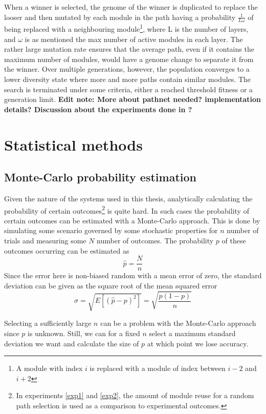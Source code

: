 When a winner is selected, the genome of the winner is duplicated to replace the looser and then mutated by each module in the path having a probability \(\frac{1}{L\omega}\) of being replaced with a neighbouring module\footnote{A module with index \(i\) is replaced with a module of index between \(i-2\) and \(i+2\)}, where L is the number of layers, and \(\omega\) is as mentioned the max number of active modules in each layer. The rather large mutation rate ensures that the average path, even if it contains the maximum number of modules, would have a genome change to separate it from the winner. Over multiple generations, however, the population converges to a lower diversity state where more and more paths contain similar modules. The search is terminated under some criteria, either a reached threshold fitness or a generation limit. 
\textbf{Edit note: More about pathnet needed? implementation details? Discussion about the experiments done in \cite{pathnet}?}

\newpage

\section{Statistical methods}
\subsection{Monte-Carlo probability estimation}
\label{mc-estimate}
Given the nature of the systems used in this thesis, analytically calculating the probability of certain outcomes\footnote{In experiments \ref{exp1} and \ref{exp2}, the amount of module reuse for a random path selection is used as a comparison to experimental outcomes.} is quite hard. In such cases the probability of certain outcomes can be estimated with a Monte-Carlo approach. This is done by simulating some scenario governed by some stochastic properties for \(n\) number of trials and measuring some \(N\) number of outcomes. The probability \(p\) of these outcomes occurring can be estimated as 
\begin{equation*}
    \hat{p}=\frac{N}{n}
\end{equation*}
Since the error here is non-biased random with a mean error of zero, the standard deviation can be given as the square root of the mean squared error 
\begin{equation*}
    \sigma=\sqrt{E[(\hat{p}-p)^{2}]} =\sqrt{\frac{p(1-p)}{n}}
\end{equation*}


Selecting a sufficiently large \(n\) can be a problem with the Monte-Carlo approach since \(p\) is unknown. Still, we can for a fixed \(n\) select a maximum standard deviation we want and calculate the size of \(p\) at which point we lose accuracy. 

